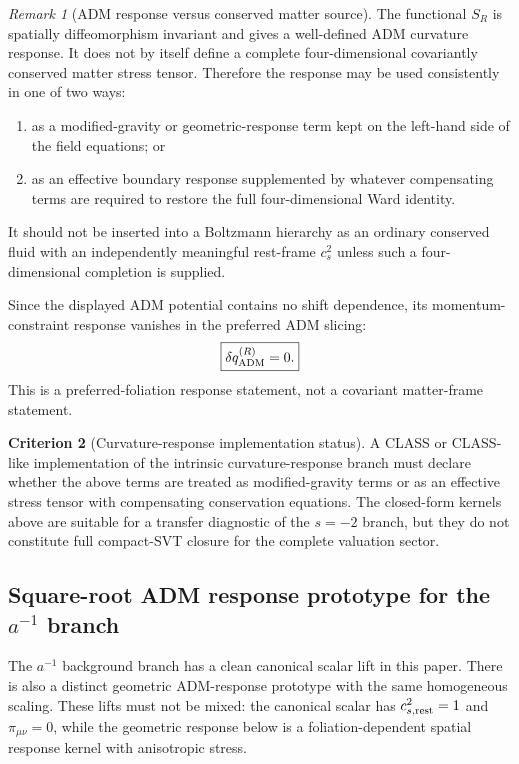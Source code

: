 \documentclass[11pt,a4paper]{article}
\numberwithin{equation}{section}
\theoremstyle{definition}
\newtheorem{criterion}{Criterion}
\theoremstyle{plain}
\theoremstyle{remark}
\newtheorem{remark}[criterion]{Remark}
\begin{document}
\begin{remark}[ADM response versus conserved matter source]
The functional \(S_R\) is spatially diffeomorphism invariant and gives a
well-defined ADM curvature response. It does not by itself define a complete
four-dimensional covariantly conserved matter stress tensor. Therefore the
response may be used consistently in one of two ways:
\begin{enumerate}
\item as a modified-gravity or geometric-response term kept on the left-hand
side of the field equations; or
\item as an effective boundary response supplemented by whatever compensating
terms are required to restore the full four-dimensional Ward identity.
\end{enumerate}
It should not be inserted into a Boltzmann hierarchy as an ordinary conserved
fluid with an independently meaningful rest-frame \(c_s^2\) unless such a
four-dimensional completion is supplied.
\end{remark}

Since the displayed ADM potential contains no shift dependence, its momentum-constraint response vanishes in the preferred ADM slicing:
\begin{equation}
\boxed{\delta q^{(R)}_{\rm ADM}=0.}
\end{equation}
This is a preferred-foliation response statement, not a covariant matter-frame statement.

\begin{criterion}[Curvature-response implementation status]
A CLASS or CLASS-like implementation of the intrinsic curvature-response branch
must declare whether the above terms are treated as modified-gravity terms or
as an effective stress tensor with compensating conservation equations. The
closed-form kernels above are suitable for a transfer diagnostic of the
\(s=-2\) branch, but they do not constitute full compact-SVT closure for the
complete valuation sector.
\end{criterion}

\subsection[Square-root ADM response prototype for the a-to-minus-one branch]{Square-root ADM response prototype for the \(a^{-1}\) branch}
\label{sec:sqrtR-response}

The \(a^{-1}\) background branch has a clean canonical scalar lift in this paper.  There is also a distinct geometric ADM-response prototype with the same homogeneous scaling.  These lifts must not be mixed: the canonical scalar has \(c_{s,\rm rest}^2=1\) and \(\pi_{\mu\nu}=0\), while the geometric response below is a foliation-dependent spatial response kernel with anisotropic stress.
\end{document}
